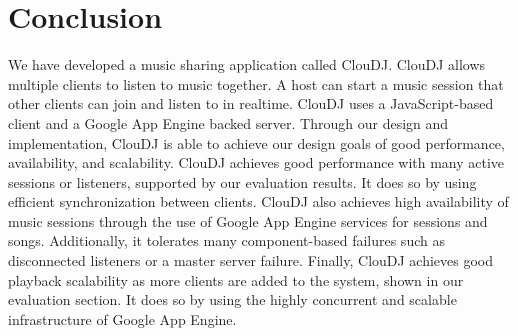 \section{Conclusion}
    \label{sec:conc}
We have developed a music sharing application called ClouDJ.
ClouDJ allows multiple clients to listen to music together. A host can start
a music session that other clients can join and listen to in
realtime. ClouDJ uses a JavaScript-based client and a Google App Engine
backed server. Through our design and implementation, ClouDJ
is able to achieve our design goals of good performance, availability, and scalability.
ClouDJ achieves good performance with many active sessions
or listeners, supported by our evaluation results. It does so by using efficient synchronization between clients.
ClouDJ also achieves high availability of music sessions through the use of Google App Engine
services for sessions and songs. Additionally, it tolerates many
component-based failures such as disconnected listeners or a master server failure.
Finally, ClouDJ achieves good playback scalability as more clients are added to the system,
shown in our evaluation section. It does so by using the highly concurrent and scalable infrastructure
of Google App Engine.